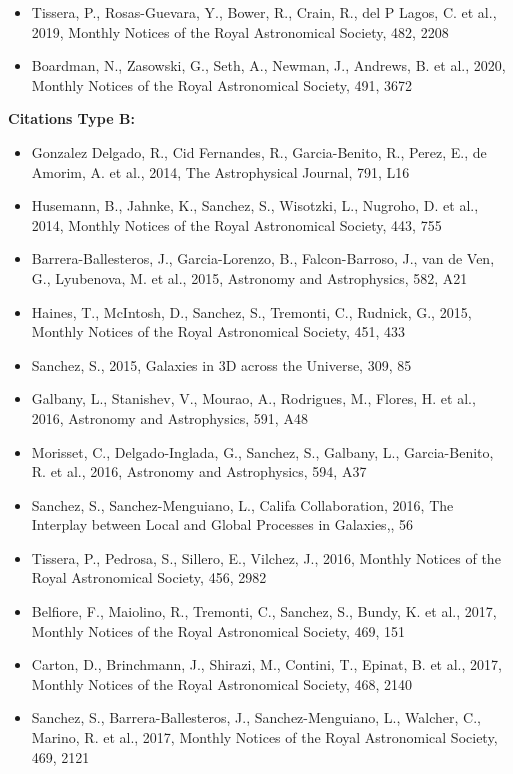\documentclass{letter}
\begin{document}
\begin{enumerate}
\begin{itemize}
\item Tissera, P., Rosas-Guevara, Y., Bower, R., Crain, R., del P Lagos, C. et al., 2019, Monthly Notices of the Royal Astronomical Society, 482, 2208
\item Boardman, N., Zasowski, G., Seth, A., Newman, J., Andrews, B. et al., 2020, Monthly Notices of the Royal Astronomical Society, 491, 3672
\end{itemize}
{\bf Citations Type B:}
\begin{itemize}
\item Gonzalez Delgado, R., Cid Fernandes, R., Garcia-Benito, R., Perez, E., de Amorim, A. et al., 2014, The Astrophysical Journal, 791, L16
\item Husemann, B., Jahnke, K., Sanchez, S., Wisotzki, L., Nugroho, D. et al., 2014, Monthly Notices of the Royal Astronomical Society, 443, 755
\item Barrera-Ballesteros, J., Garcia-Lorenzo, B., Falcon-Barroso, J., van de Ven, G., Lyubenova, M. et al., 2015, Astronomy and Astrophysics, 582, A21
\item Haines, T., McIntosh, D., Sanchez, S., Tremonti, C., Rudnick, G., 2015, Monthly Notices of the Royal Astronomical Society, 451, 433
\item Sanchez, S., 2015, Galaxies in 3D across the Universe, 309, 85
\item Galbany, L., Stanishev, V., Mourao, A., Rodrigues, M., Flores, H. et al., 2016, Astronomy and Astrophysics, 591, A48
\item Morisset, C., Delgado-Inglada, G., Sanchez, S., Galbany, L., Garcia-Benito, R. et al., 2016, Astronomy and Astrophysics, 594, A37
\item Sanchez, S., Sanchez-Menguiano, L., Califa Collaboration, 2016, The Interplay between Local and Global Processes in Galaxies,, 56
\item Tissera, P., Pedrosa, S., Sillero, E., Vilchez, J., 2016, Monthly Notices of the Royal Astronomical Society, 456, 2982
\item Belfiore, F., Maiolino, R., Tremonti, C., Sanchez, S., Bundy, K. et al., 2017, Monthly Notices of the Royal Astronomical Society, 469, 151
\item Carton, D., Brinchmann, J., Shirazi, M., Contini, T., Epinat, B. et al., 2017, Monthly Notices of the Royal Astronomical Society, 468, 2140
\item Sanchez, S., Barrera-Ballesteros, J., Sanchez-Menguiano, L., Walcher, C., Marino, R. et al., 2017, Monthly Notices of the Royal Astronomical Society, 469, 2121

\end{itemize}
\end{enumerate}
\end{document}
